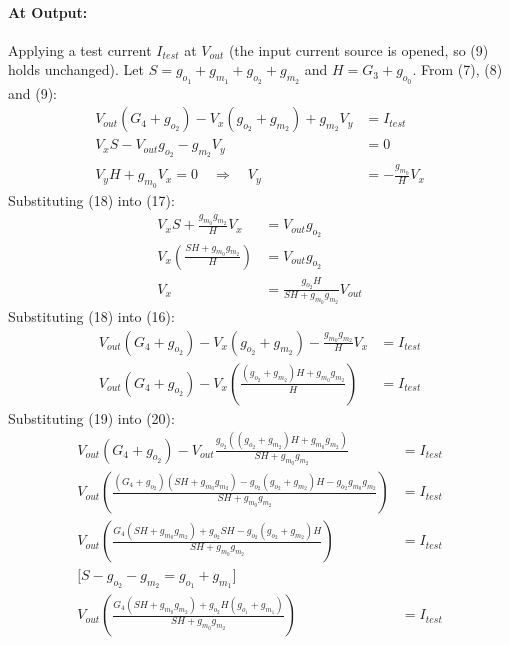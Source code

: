 \begin{enumerate}
    \paragraph{At Output:} Applying a test current $I_{test}$
      at $V_{out}$ (the input current source is opened, so (9) holds
      unchanged). Let \(S = g_{o_1} + g_{m_1} + g_{o_2} + g_{m_2}\) and
      \(H = G_3 + g_{o_0}\). From (7), (8) and (9):
      \begin{align*}
        V_{out}(G_4 + g_{o_2}) - V_{x}(g_{o_2} + g_{m_2}) + g_{m_2}V_{y} &= I_{test} \tag{16} \\
        V_{x} S - V_{out}g_{o_2} - g_{m_2}V_{y} &= 0 \tag{17} \\
        V_{y} H + g_{m_0}V_{x} = 0 \quad \Rightarrow \quad V_{y} &= -\frac{g_{m_0}}{H} V_{x} \tag{18}
      \end{align*}
      Substituting (18) into (17):
      \begin{align*}
        V_{x} S + \frac{g_{m_0} g_{m_2}}{H} V_{x} &= V_{out}g_{o_2} \\
        V_{x} \left( \frac{S H + g_{m_0} g_{m_2}}{H} \right) &= V_{out}g_{o_2} \\
        V_{x} &= \frac{g_{o_2} H}{S H + g_{m_0} g_{m_2}} V_{out} \tag{19}
      \end{align*}
      Substituting (18) into (16):
      \begin{align*}
        V_{out}(G_4 + g_{o_2}) - V_{x}(g_{o_2} + g_{m_2}) - \frac{g_{m_0} g_{m_2}}{H} V_{x} &= I_{test} \\
        V_{out}(G_4 + g_{o_2}) - V_{x} \left( \frac{(g_{o_2} + g_{m_2}) H + g_{m_0} g_{m_2}}{H} \right) &= I_{test} \tag{20}
      \end{align*}
      Substituting (19) into (20):
      \begin{align*}
        V_{out}(G_4 + g_{o_2}) - V_{out} \frac{g_{o_2} \left( (g_{o_2} + g_{m_2}) H + g_{m_0} g_{m_2} \right)}{S H + g_{m_0} g_{m_2}} &= I_{test} \\
        V_{out} \left( \frac{(G_4 + g_{o_2})(S H + g_{m_0} g_{m_2}) - g_{o_2}(g_{o_2} + g_{m_2}) H - g_{o_2} g_{m_0} g_{m_2}}{S H + g_{m_0} g_{m_2}} \right) &= I_{test} \\
        V_{out} \left( \frac{G_4 (S H + g_{m_0} g_{m_2}) + g_{o_2} S H - g_{o_2}(g_{o_2} + g_{m_2}) H}{S H + g_{m_0} g_{m_2}} \right) &= I_{test} \\
        \text{[} S - g_{o_2} - g_{m_2} = g_{o_1} + g_{m_1} \text{]} \\
        V_{out} \left( \frac{G_4 (S H + g_{m_0} g_{m_2}) + g_{o_2} H (g_{o_1} + g_{m_1})}{S H + g_{m_0} g_{m_2}} \right) &= I_{test}

\end{align*}
\end{enumerate}
